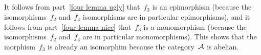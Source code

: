 \subsection{}

It follows from part~\ref{four lemma ugly} that~$f_3$ is an epimorphism (because the isomorphisms~$f_2$ and~$f_4$ isomorphisms are in particular epimorphisms), and it follows from part~\ref{four lemma nice} that~$f_3$ is a monomorphism (because the isomorphisms~$f_2$ and~$f_4$ are in particular monomorphisms).
This shows that the morphism~$f_3$ is already an isomorphim because the category~$\mathcal{A}$ is abelian.




